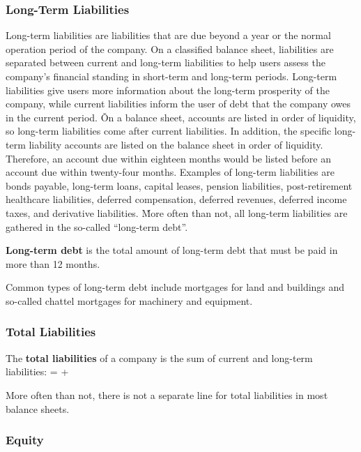\subsubsection{Long-Term Liabilities}

Long-term liabilities are liabilities that are due beyond a year or the normal operation period of the company. On a
classified balance sheet, liabilities are separated between current and long-term liabilities to help users assess
the company's financial standing in short-term and long-term periods. Long-term liabilities give users more
information about the long-term prosperity of the company, while current liabilities inform the user of debt that the
company owes in the current period. \v

On a balance sheet, accounts are listed in order of liquidity, so long-term liabilities come after current
liabilities. In addition, the specific long-term liability accounts are listed on the balance sheet in order of
liquidity. Therefore, an account due within eighteen months would be listed before an account due within twenty-four
months. Examples of long-term liabilities are bonds payable, long-term loans, capital leases, pension liabilities,
post-retirement healthcare liabilities, deferred compensation, deferred revenues, deferred income taxes, and
derivative liabilities. \v

More often than not, all long-term liabilities are gathered in the so-called ``long-term debt''.

\textbf{Long-term debt} is the total amount of long-term debt that must be paid in more than 12 months.
\ed

\be
Common types of long-term debt include mortgages for land and buildings and so-called chattel mortgages for machinery
and equipment.
\ee

\subsubsection{Total Liabilities}

The \textbf{total liabilities} of a company is the sum of current and long-term liabilities:
\bse
{} =  + 
\ese
\ed

More often than not, there is not a separate line for total liabilities in most balance sheets.

\subsubsection{Equity}

